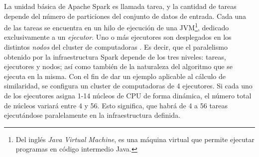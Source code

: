\bigskip La unidad básica de Apache Spark es llamada tarea, y la cantidad de tareas depende del número de particiones del conjunto de datos de entrada. Cada una de las tareas se encuentra en un hilo de ejecución de una JVM\footnote{Del inglés \textit{Java Virtual Machine}, es una máquina virtual que permite ejecutar programas en código intermedio Java.}, dedicado exclusivamente a un \textit{ejecutor}. Uno o más ejecutores son desplegados en los distintos \textit{nodos} del cluster de computadoras \citep{janardhanan2020optimum}. Es decir, que el paralelismo obtenido por la infraestructura Spark depende de los tres niveles: tareas, ejecutores y nodos; así como también de la naturaleza del algoritmo que se ejecuta en la misma. Con el fin de dar un ejemplo aplicable al cálculo de similaridad, se configura un cluster de computadoras de 4 ejecutores. Si cada uno de los ejecutores asigna 1-14 núcleos de CPU de forma dinámica, el número total de núcleos variará entre 4 y 56. Esto significa, que habrá de 4 a 56 tareas ejecutándose paralelamente en la infraestructura definida.

